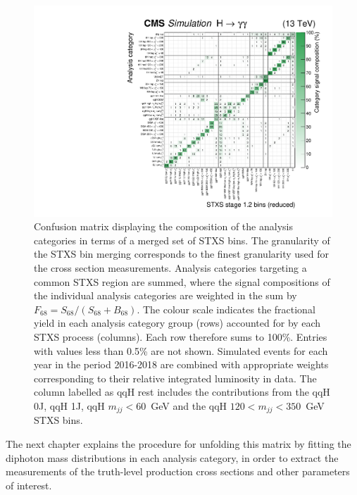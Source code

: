 \begin{figure}
  \centering
  \includegraphics[width=.95\textwidth]{Figures/hgg_overview/purityMatrix_merged.pdf}
  \caption[Confusion matrix for the analysis categories]
  {
    Confusion matrix displaying the composition of the analysis categories in terms of a merged set of STXS bins. The granularity of the STXS bin merging corresponds to the finest granularity used for the cross section measurements. Analysis categories targeting a common STXS region are summed, where the signal compositions of the individual analysis categories are weighted in the sum by $F_{68}=S_{68}/(S_{68}+B_{68})$. The colour scale indicates the fractional yield in each analysis category group (rows) accounted for by each STXS process (columns). Each row therefore sums to 100\%. Entries with values less than 0.5\% are not shown. Simulated events for each year in the period 2016-2018 are combined with appropriate weights corresponding to their relative integrated luminosity in data. The column labelled as qqH rest includes the contributions from the qqH 0J, qqH 1J, qqH $m_{jj}<60$~GeV and the qqH $120<m_{jj}<350$~GeV STXS bins.
  }
  \label{fig:purity_matrix}
\end{figure}

The next chapter explains the procedure for unfolding this matrix by fitting the diphoton mass distributions in each analysis category, in order to extract the measurements of the truth-level production cross sections and other parameters of interest.







